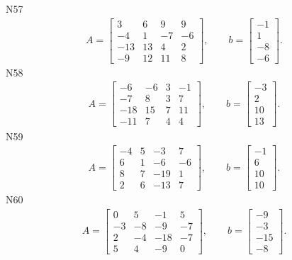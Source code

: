 \documentclass[11pt]{report}
\begin{document}
N57
\begin{align*}
 A = \left[\begin{matrix}3 & 6 & 9 & 9\\-4 & 1 & -7 & -6\\-13 & 13 & 4 & 2\\-9 & 12 & 11 & 8\end{matrix}\right],
\qquad b = \left[\begin{matrix}-1\\1\\-8\\-6\end{matrix}\right]. 
 \end{align*}
N58
\begin{align*}
 A = \left[\begin{matrix}-6 & -6 & 3 & -1\\-7 & 8 & 3 & 7\\-18 & 15 & 7 & 11\\-11 & 7 & 4 & 4\end{matrix}\right],
\qquad b = \left[\begin{matrix}-3\\2\\10\\13\end{matrix}\right]. 
 \end{align*}
N59
\begin{align*}
 A = \left[\begin{matrix}-4 & 5 & -3 & 7\\6 & 1 & -6 & -6\\8 & 7 & -19 & 1\\2 & 6 & -13 & 7\end{matrix}\right],
\qquad b = \left[\begin{matrix}-1\\6\\10\\10\end{matrix}\right]. 
 \end{align*}
N60
\begin{align*}
 A = \left[\begin{matrix}0 & 5 & -1 & 5\\-3 & -8 & -9 & -7\\2 & -4 & -18 & -7\\5 & 4 & -9 & 0\end{matrix}\right],
\qquad b = \left[\begin{matrix}-9\\-3\\-15\\-8\end{matrix}\right]. 
 \end{align*}
\end{document}
